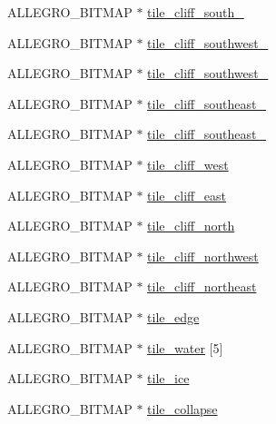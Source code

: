 \begin{DoxyCompactItemize}
\item 
A\-L\-L\-E\-G\-R\-O\-\_\-\-B\-I\-T\-M\-A\-P $\ast$ \hyperlink{classc__map_ae725ccf9eb9daefefdb9b58b00388913}{tile\-\_\-cliff\-\_\-south\-\_}
\item 
A\-L\-L\-E\-G\-R\-O\-\_\-\-B\-I\-T\-M\-A\-P $\ast$ \hyperlink{classc__map_abecd9b0a1aab4c4e02cbe698ddb487ee}{tile\-\_\-cliff\-\_\-southwest\-\_}
\item 
A\-L\-L\-E\-G\-R\-O\-\_\-\-B\-I\-T\-M\-A\-P $\ast$ \hyperlink{classc__map_ae1b595833e6967f8d27fd5a2252d12b3}{tile\-\_\-cliff\-\_\-southwest\-\_}
\item 
A\-L\-L\-E\-G\-R\-O\-\_\-\-B\-I\-T\-M\-A\-P $\ast$ \hyperlink{classc__map_a9d5707e014681a6d16044d483688c081}{tile\-\_\-cliff\-\_\-southeast\-\_}
\item 
A\-L\-L\-E\-G\-R\-O\-\_\-\-B\-I\-T\-M\-A\-P $\ast$ \hyperlink{classc__map_a1aefdb38df373482aff57b9243ec9d67}{tile\-\_\-cliff\-\_\-southeast\-\_}
\item 
A\-L\-L\-E\-G\-R\-O\-\_\-\-B\-I\-T\-M\-A\-P $\ast$ \hyperlink{classc__map_aa40008668fa55a28089cd20c03563926}{tile\-\_\-cliff\-\_\-west}
\item 
A\-L\-L\-E\-G\-R\-O\-\_\-\-B\-I\-T\-M\-A\-P $\ast$ \hyperlink{classc__map_a105d6f1355ca490246a8a5bf56bbe844}{tile\-\_\-cliff\-\_\-east}
\item 
A\-L\-L\-E\-G\-R\-O\-\_\-\-B\-I\-T\-M\-A\-P $\ast$ \hyperlink{classc__map_aa8892af60c621c949f8f46485bd6f8b8}{tile\-\_\-cliff\-\_\-north}
\item 
A\-L\-L\-E\-G\-R\-O\-\_\-\-B\-I\-T\-M\-A\-P $\ast$ \hyperlink{classc__map_aec73bf9c12354078037cc6d1b4de6025}{tile\-\_\-cliff\-\_\-northwest}
\item 
A\-L\-L\-E\-G\-R\-O\-\_\-\-B\-I\-T\-M\-A\-P $\ast$ \hyperlink{classc__map_a1dd3e087030dad02e1329416daaf58bc}{tile\-\_\-cliff\-\_\-northeast}
\item 
A\-L\-L\-E\-G\-R\-O\-\_\-\-B\-I\-T\-M\-A\-P $\ast$ \hyperlink{classc__map_a0ba260cfc9fd354f0b05900b90367cfa}{tile\-\_\-edge}
\item 
A\-L\-L\-E\-G\-R\-O\-\_\-\-B\-I\-T\-M\-A\-P $\ast$ \hyperlink{classc__map_a1d7fc093a6e24ba1ea66b66505ad8581}{tile\-\_\-water} \mbox{[}5\mbox{]}
\item 
A\-L\-L\-E\-G\-R\-O\-\_\-\-B\-I\-T\-M\-A\-P $\ast$ \hyperlink{classc__map_a12e5d9ac851eba093b98998593b7f3a9}{tile\-\_\-ice}
\item 
A\-L\-L\-E\-G\-R\-O\-\_\-\-B\-I\-T\-M\-A\-P $\ast$ \hyperlink{classc__map_ae13539d062f5a9eb89ebf72d7e3890be}{tile\-\_\-collapse}

\end{DoxyCompactItemize}
